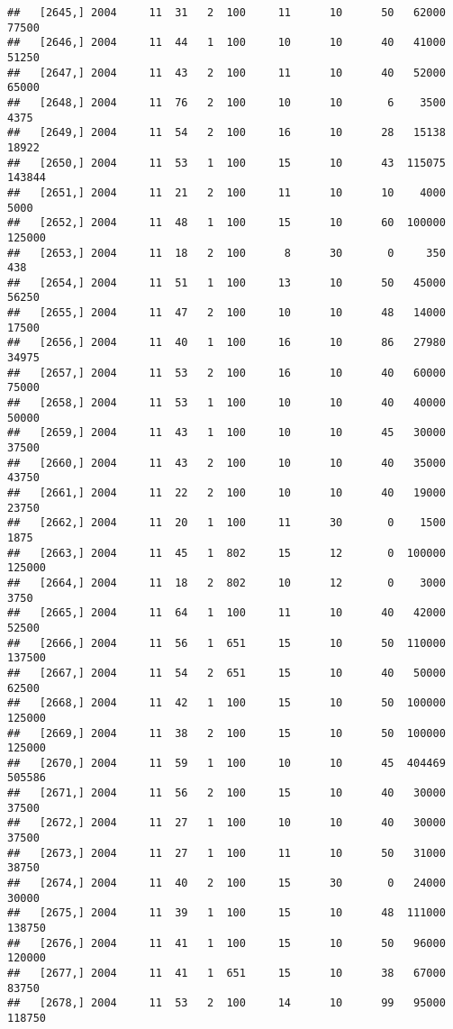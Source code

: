 \documentclass{article}\usepackage[]{graphicx}\usepackage[]{color}
\makeatletter
\newenvironment{kframe}{%
 \def\at@end@of@kframe{}%
 \ifinner\ifhmode%
  \def\at@end@of@kframe{\end{minipage}}%
  \begin{minipage}{\columnwidth}%
 \fi\fi%
 \def\FrameCommand##1{\hskip\@totalleftmargin \hskip-\fboxsep
 \colorbox{shadecolor}{##1}\hskip-\fboxsep
     \hskip-\linewidth \hskip-\@totalleftmargin \hskip\columnwidth}%
 \MakeFramed {\advance\hsize-\width
   \@totalleftmargin\z@ \linewidth\hsize
   \@setminipage}}%
 {\par\unskip\endMakeFramed%
 \at@end@of@kframe}
\newenvironment{knitrout}{}{} %
\makeatother
\begin{document}
\begin{knitrout}
\begin{kframe}
\begin{verbatim}
##   [2645,] 2004     11  31   2  100     11      10      50   62000   77500
##   [2646,] 2004     11  44   1  100     10      10      40   41000   51250
##   [2647,] 2004     11  43   2  100     11      10      40   52000   65000
##   [2648,] 2004     11  76   2  100     10      10       6    3500    4375
##   [2649,] 2004     11  54   2  100     16      10      28   15138   18922
##   [2650,] 2004     11  53   1  100     15      10      43  115075  143844
##   [2651,] 2004     11  21   2  100     11      10      10    4000    5000
##   [2652,] 2004     11  48   1  100     15      10      60  100000  125000
##   [2653,] 2004     11  18   2  100      8      30       0     350     438
##   [2654,] 2004     11  51   1  100     13      10      50   45000   56250
##   [2655,] 2004     11  47   2  100     10      10      48   14000   17500
##   [2656,] 2004     11  40   1  100     16      10      86   27980   34975
##   [2657,] 2004     11  53   2  100     16      10      40   60000   75000
##   [2658,] 2004     11  53   1  100     10      10      40   40000   50000
##   [2659,] 2004     11  43   1  100     10      10      45   30000   37500
##   [2660,] 2004     11  43   2  100     10      10      40   35000   43750
##   [2661,] 2004     11  22   2  100     10      10      40   19000   23750
##   [2662,] 2004     11  20   1  100     11      30       0    1500    1875
##   [2663,] 2004     11  45   1  802     15      12       0  100000  125000
##   [2664,] 2004     11  18   2  802     10      12       0    3000    3750
##   [2665,] 2004     11  64   1  100     11      10      40   42000   52500
##   [2666,] 2004     11  56   1  651     15      10      50  110000  137500
##   [2667,] 2004     11  54   2  651     15      10      40   50000   62500
##   [2668,] 2004     11  42   1  100     15      10      50  100000  125000
##   [2669,] 2004     11  38   2  100     15      10      50  100000  125000
##   [2670,] 2004     11  59   1  100     10      10      45  404469  505586
##   [2671,] 2004     11  56   2  100     15      10      40   30000   37500
##   [2672,] 2004     11  27   1  100     10      10      40   30000   37500
##   [2673,] 2004     11  27   1  100     11      10      50   31000   38750
##   [2674,] 2004     11  40   2  100     15      30       0   24000   30000
##   [2675,] 2004     11  39   1  100     15      10      48  111000  138750
##   [2676,] 2004     11  41   1  100     15      10      50   96000  120000
##   [2677,] 2004     11  41   1  651     15      10      38   67000   83750
##   [2678,] 2004     11  53   2  100     14      10      99   95000  118750

\end{verbatim}
\end{kframe}
\end{knitrout}
\end{document}
